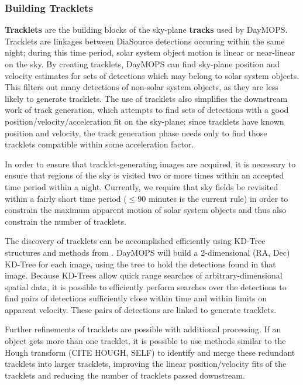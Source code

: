 \documentclass[12pt,preprint]{aastex}
\begin{document}
\subsubsection{Building Tracklets}


\textbf{Tracklets} are the building blocks of the sky-plane
\textbf{tracks} used by DayMOPS.  Tracklets are linkages between
DiaSource detections occuring within the same night; during this time
period, solar system object motion is linear or near-linear on the
sky. By creating tracklets, DayMOPS can find sky-plane position and
velocity estimates for sets of detections which may belong to solar
system objects.  This filters out many detections of non-solar system
objects, as they are less likely to generate tracklets.  The use of
tracklets also simplifies the downstream work of track generation,
which attempts to find sets of detections with a good
position/velocity/acceleration fit on the sky-plane; since tracklets
have known position and velocity, the track generation phase needs
only to find those tracklets compatible within some acceleration
factor.

In order to ensure that tracklet-generating images are acquired, it is
necessary to ensure that regions of the sky is visited two or more
times within an accepted time period within a night.  Currently, we
require that sky fields be revisited within a fairly short time period
($\leq 90$ minutes is the current rule) in order to constrain the
maximum apparent motion of solar system objects and thus also
constrain the number of tracklets.

The discovery of tracklets can be accomplished efficiently using
KD-Tree structures \citep{bentley_kdtrees} and methods from
\citet{kubica_thesis}.  DayMOPS will build a 2-dimensional (RA, Dec)
KD-Tree for each image, using the tree to hold the detections found in
that image.  Because KD-Trees allow quick range searches of
arbitrary-dimensional spatial data, it is possible to efficiently
perform searches over the detections to find pairs of detections
sufficiently close within time and within limits on apparent
velocity. These pairs of detections are linked to generate tracklets.


Further refinements of tracklets are possible with additional
processing. If an object gets more than one tracklet, it is possible
to use methods similar to the Hough transform (CITE HOUGH, SELF) to
identify and merge these redundant tracklets into larger tracklets,
improving the linear position/velocity fits of the tracklets and
reducing the number of tracklets passed downstream.
\end{document}
